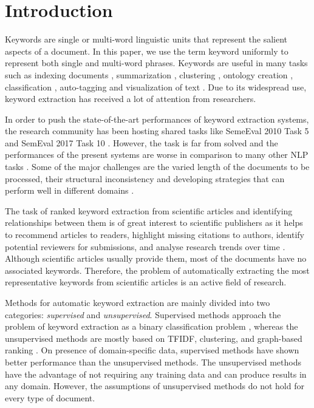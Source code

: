 \documentclass[conference]{IEEEtran}
\begin{document}
\section{Introduction}
Keywords are single or multi-word linguistic units that represent the salient aspects of a document. In this paper, we use the term
keyword uniformly to represent both single and multi-word phrases. Keywords are useful in many tasks
such as indexing documents \cite{gutwin1999improving}, summarization \cite{litvak2008graph}, clustering \cite{hammouda2005corephrase}, ontology creation \cite{gulla2007ontology}, classification \cite{hulth2006study}, auto-tagging \cite{wu2010automatic} and visualization of text \cite{collins2009parallel}. Due to its widespread use, keyword extraction has received a lot of attention from researchers.

In order to push the state-of-the-art performances of keyword extraction systems, the research community has been hosting shared tasks like SemeEval 2010 Task 5 \cite{kim2010semeval} and SemEval 2017 Task 10 \cite{augenstein2017semeval}. However, the task is far from solved and the performances of the present systems are worse in comparison to many other NLP tasks \cite{liu2010automatic}. Some of the major challenges are the varied length of the documents to be processed, their structural inconsistency and developing strategies that can perform well in different domains \cite{hasan2014automatic}.

The task of ranked keyword extraction from scientific articles and identifying relationships between them is of great interest to scientific publishers as it helps to recommend articles to readers, highlight
missing citations to authors, identify potential reviewers for submissions, and analyse research trends over time \cite{augenstein2017semeval}. Although scientific articles usually provide them, most of the documents have no associated keywords. Therefore, the problem of automatically extracting the most representative keywords from scientific articles is an active field of research. 

Methods for automatic keyword extraction are mainly divided into two categories: \textit{supervised} and \textit{unsupervised}. 
Supervised methods approach the problem of keyword extraction as a binary classification problem \cite{hasan2014automatic}, whereas the unsupervised methods are mostly based on TFIDF, clustering, and graph-based ranking \cite{hasan2010conundrums}. On presence of domain-specific data, supervised methods have shown better performance than the unsupervised methods. The unsupervised methods have the advantage of not requiring any training data and can produce results in any domain. However, the assumptions of unsupervised methods do not hold for every type of document. 
\end{document}
